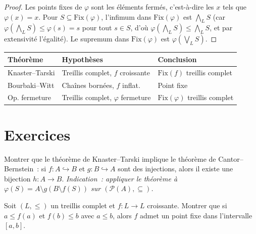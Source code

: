 \begin{proof}
Les points fixes de $\varphi$ sont les \'el\'ements ferm\'es, c'est-\`a-dire les $x$ tels
que $\varphi(x) = x$. Pour $S \subseteq \mathrm{Fix}(\varphi)$, l'infimum dans
$\mathrm{Fix}(\varphi)$ est $\bigwedge_L S$ (car $\varphi(\bigwedge_L S) \leq
\varphi(s) = s$ pour tout $s \in S$, d'o\`u $\varphi(\bigwedge_L S) \leq \bigwedge_L S$,
et par extensivit\'e l'\'egalit\'e). Le supremum dans $\mathrm{Fix}(\varphi)$ est
$\varphi(\bigvee_L S)$.
\end{proof}

\begin{formules}[title=\textbf{Points fixes dans les ensembles ordonn\'es}]
\begin{center}
\renewcommand{\arraystretch}{1.3}
\begin{tabular}{|l|l|l|}
\hline
\textbf{Th\'eor\`eme} & \textbf{Hypoth\`eses} & \textbf{Conclusion} \\
\hline
Knaster--Tarski & Treillis complet, $f$ croissante & $\mathrm{Fix}(f)$ treillis complet \\
Bourbaki--Witt & Cha\^ines born\'ees, $f$ inflat. & Point fixe \\
Op. fermeture & Treillis complet, $\varphi$ fermeture & $\mathrm{Fix}(\varphi)$ treillis complet \\
\hline
\end{tabular}
\end{center}
\end{formules}

\section{Exercices}

\begin{exercice}
Montrer que le th\'eor\`eme de Knaster--Tarski implique le th\'eor\`eme de
Cantor--Bernstein~: si $f\colon A \hookrightarrow B$ et $g\colon B \hookrightarrow A$ sont
des injections, alors il existe une bijection $h\colon A \to B$.
\emph{Indication~: appliquer le th\'eor\`eme \`a $\varphi(S) = A \setminus g(B \setminus f(S))$
sur $(\mathcal{P}(A), \subseteq)$.}
\end{exercice}

\begin{exercice}
Soit $(L, \leq)$ un treillis complet et $f\colon L \to L$ croissante. Montrer que si
$a \leq f(a)$ et $f(b) \leq b$ avec $a \leq b$, alors $f$ admet un point fixe dans
l'intervalle $[a, b]$.
\end{exercice}

